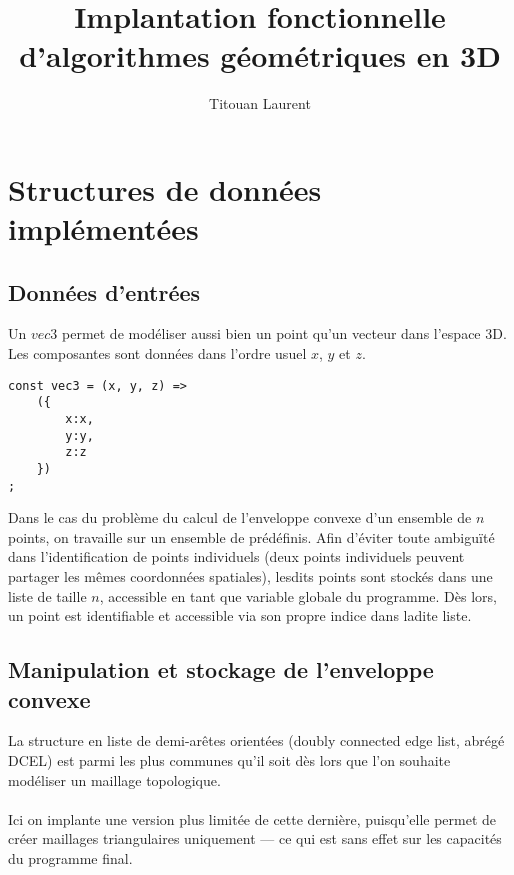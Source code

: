\documentclass[]{article}
\title{Implantation fonctionnelle d'algorithmes géométriques en 3D}
\author{Titouan Laurent}
\date{}
\begin{document}
\maketitle

\section{Structures de données implémentées}

\subsection{Données d'entrées}
Un $vec3$ permet de modéliser aussi bien un point qu'un vecteur dans l'espace 3D. Les composantes sont données dans l'ordre usuel $x$, $y$ et $z$.
\begin{lstlisting}
const vec3 = (x, y, z) =>
	({
		x:x,
		y:y,
		z:z
	})
;
\end{lstlisting}
Dans le cas du problème du calcul de l'enveloppe convexe d'un ensemble de $n$ points, on travaille sur un ensemble de prédéfinis. Afin d'éviter toute ambiguïté dans l'identification de points individuels (deux points individuels peuvent partager les mêmes coordonnées spatiales), lesdits points sont stockés dans une liste de taille $n$, accessible en tant que variable globale du programme. Dès lors, un point est identifiable et accessible via son propre indice dans ladite liste.
\\

\subsection{Manipulation et stockage de l'enveloppe convexe}
La structure en liste de demi-arêtes orientées (doubly connected edge list, abrégé DCEL) est parmi les plus communes qu'il soit dès lors que l'on souhaite modéliser un maillage topologique.\\\\
Ici on implante une version plus limitée de cette dernière, puisqu'elle permet de créer maillages triangulaires uniquement — ce qui est sans effet sur les capacités du programme final.
\end{document}
